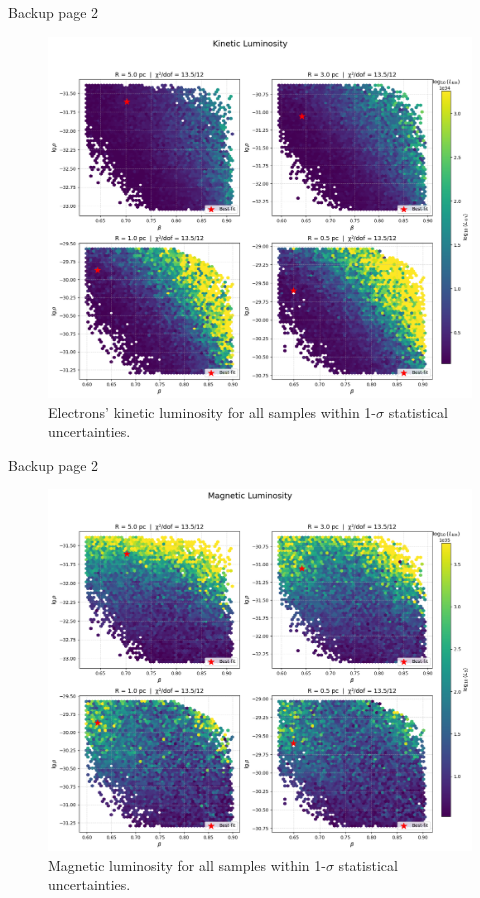 \documentclass[10pt,aspectratio=169,mathserif]{beamer}
\begin{document}
\begin{frame}{Backup page 2}
\begin{figure}[ht]
    \centering
        \includegraphics[width=0.5\linewidth]{electron_kin.png}
        \caption{Electrons' kinetic luminosity for all samples within 1-$\sigma$ statistical uncertainties.}
        \label{fig:sub1}
\end{figure}
\end{frame}
\begin{frame}{Backup page 2}
\begin{figure}[ht]
    \centering
        \includegraphics[width=0.5\linewidth]{mag.png}
        \caption{Magnetic luminosity for all samples within 1-$\sigma$ statistical uncertainties.}
        \label{fig:sub1}
\end{figure}
\end{frame}
\end{document}

